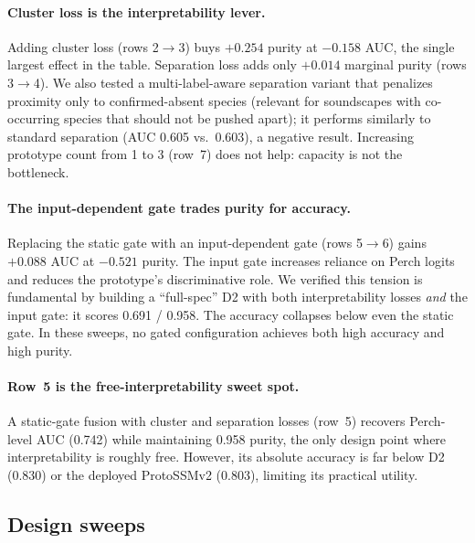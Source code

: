 \documentclass{ceurart}
\begin{document}
\paragraph{Cluster loss is the interpretability lever.}
Adding cluster loss (rows 2$\rightarrow$3) buys $+0.254$ purity at $-0.158$ AUC, the single largest effect in the table.
Separation loss adds only $+0.014$ marginal purity (rows 3$\rightarrow$4).
We also tested a multi-label-aware separation variant that penalizes proximity only to confirmed-absent species (relevant for soundscapes with co-occurring species that should not be pushed apart); it performs similarly to standard separation (AUC 0.605 vs.\ 0.603), a negative result.
Increasing prototype count from 1 to 3 (row~7) does not help: capacity is not the bottleneck.

\paragraph{The input-dependent gate trades purity for accuracy.}
Replacing the static gate with an input-dependent gate (rows 5$\rightarrow$6) gains $+0.088$ AUC at $-0.521$ purity.
The input gate increases reliance on Perch logits and reduces the prototype's discriminative role.
We verified this tension is fundamental by building a ``full-spec'' D2 with both interpretability losses \emph{and} the input gate: it scores 0.691 / 0.958.
The accuracy collapses below even the static gate.
In these sweeps, no gated configuration achieves both high accuracy and high purity.

\paragraph{Row~5 is the free-interpretability sweet spot.}
A static-gate fusion with cluster and separation losses (row~5) recovers Perch-level AUC (0.742) while maintaining 0.958 purity, the only design point where interpretability is roughly free.
However, its absolute accuracy is far below D2 (0.830) or the deployed ProtoSSMv2 (0.803), limiting its practical utility.

\subsection{Design sweeps}
\end{document}
